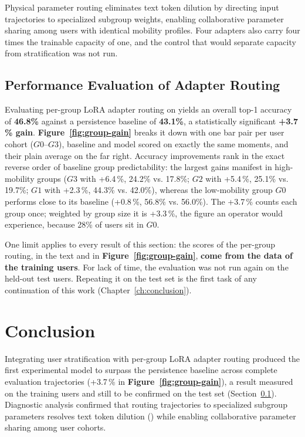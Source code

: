 Physical parameter routing eliminates text token dilution by directing input trajectories to specialized subgroup weights, enabling collaborative parameter sharing among users with identical mobility profiles. Four adapters also carry four times the trainable capacity of one, and the control that would separate capacity from stratification was not run.

\subsection{Performance Evaluation of Adapter Routing}
\label{sec:groups-results}

Evaluating per-group LoRA adapter routing on \Dmob{} yields an overall top-1 accuracy of \textbf{46.8\%} against a persistence baseline of \textbf{43.1\%}, a statistically significant \textbf{+3.7\,\% gain}. \textbf{Figure~\ref{fig:group-gain}} breaks it down with one bar pair per user cohort ($G0$--$G3$), baseline and model scored on exactly the same moments, and their plain average on the far right. Accuracy improvements rank in the exact reverse order of baseline group predictability: the largest gains manifest in high-mobility groups ($G3$ with +6.4\,\%, 24.2\% vs. 17.8\%; $G2$ with +5.4\,\%, 25.1\% vs. 19.7\%; $G1$ with +2.3\,\%, 44.3\% vs. 42.0\%), whereas the low-mobility group $G0$ performs close to its baseline (+0.8\,\%, 56.8\% vs. 56.0\%). The +3.7\,\% counts each group once; weighted by group size it is +3.3\,\%, the figure an operator would experience, because 28\% of users sit in $G0$.



One limit applies to every result of this section: the scores of the per-group routing, in the text and in \textbf{Figure~\ref{fig:group-gain}}, \textbf{come from the data of the training users}. For lack of time, the evaluation was not run again on the held-out test users. Repeating it on the test set is the first task of any continuation of this work (Chapter~\ref{ch:conclusion}).

\section{Conclusion}
\label{sec:retro-groups}

Integrating user stratification with per-group LoRA adapter routing produced the first experimental model to surpass the persistence baseline across complete evaluation trajectories (+3.7\,\% in \textbf{Figure~\ref{fig:group-gain}}), a result measured on the training users and still to be confirmed on the test set (Section~\ref{sec:groups-results}). Diagnostic analysis confirmed that routing trajectories to specialized subgroup parameters resolves text token dilution (\textbf{}) while enabling collaborative parameter sharing among user cohorts.

